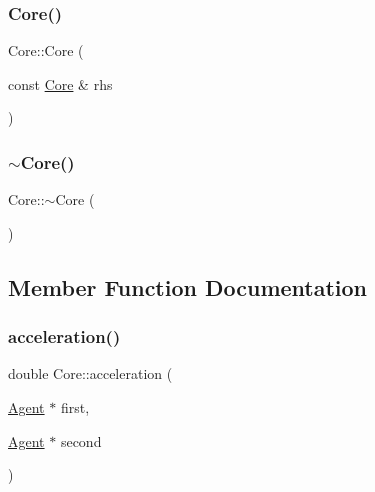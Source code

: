 \subsubsection{\texorpdfstring{Core()}{Core()}\hspace{0.1cm}{\footnotesize\ttfamily [2/2]}}
{\footnotesize\ttfamily Core\+::\+Core (\begin{DoxyParamCaption}\item[{const \hyperlink{class_n_a_m_e_s_p_a_c_e_1_1_core}{Core} \&}]{rhs }\end{DoxyParamCaption})}

\mbox{\label{class_n_a_m_e_s_p_a_c_e_1_1_core_a776f8c46504b14183883c6273f93eaed}} 
\subsubsection{\texorpdfstring{$\sim$\+Core()}{~Core()}}
{\footnotesize\ttfamily Core\+::$\sim$\+Core (\begin{DoxyParamCaption}{ }\end{DoxyParamCaption})}



\subsection{Member Function Documentation}
\mbox{\label{class_n_a_m_e_s_p_a_c_e_1_1_core_a9aae5456022531811115080c388efdf4}} 
\subsubsection{\texorpdfstring{acceleration()}{acceleration()}}
{\footnotesize\ttfamily double Core\+::acceleration (\begin{DoxyParamCaption}\item[{\hyperlink{class_n_a_m_e_s_p_a_c_e_1_1_agent}{Agent} $\ast$}]{first,  }\item[{\hyperlink{class_n_a_m_e_s_p_a_c_e_1_1_agent}{Agent} $\ast$}]{second }\end{DoxyParamCaption})}



